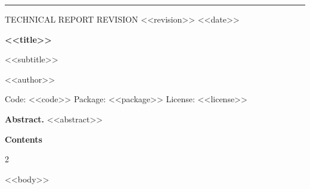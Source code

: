 \documentclass[11pt,a4paper]{article}
\begin{document}
\thispagestyle{first}

{\color{mgteal}\rule{\textwidth}{3pt}}\par
\vspace{4pt}
{\sffamily\footnotesize\color{mgmuted}TECHNICAL REPORT \quad\textperiodcentered\quad REVISION <<revision>> \quad\textperiodcentered\quad <<date>>\par}
\vspace{14pt}
{\sffamily\bfseries\fontsize{26}{30}\selectfont\color{mgdark}<<title>>\par}
\vspace{6pt}
{\sffamily\fontsize{15}{19}\selectfont\color{mgdark}<<subtitle>>\par}
\vspace{12pt}
{\sffamily\large <<author>>\par}
\vspace{3pt}
{\sffamily\footnotesize\color{mgmuted}Code: <<code>> \quad\textperiodcentered\quad Package: <<package>> \quad\textperiodcentered\quad License: <<license>>\par}
\vspace{16pt}

\begin{keybox}
{\sffamily\bfseries\color{mgdark}Abstract.}\enspace
<<abstract>>
\end{keybox}

\vspace{2pt}
{\sffamily\bfseries\large\color{mgdark}Contents\par}\vspace{4pt}
{\setlength{\parskip}{0pt}\setlength{\columnsep}{1.2cm}\begin{multicols}{2}\makeatletter{}\makeatother\end{multicols}}
\clearpage

<<body>>
\end{document}
